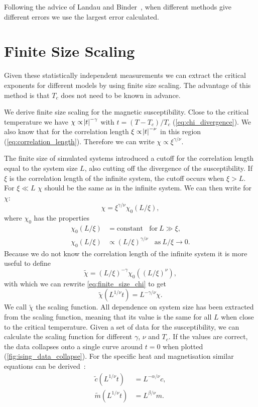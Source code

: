 \documentclass[11pt, a4paper]{report} %
\begin{document}
Following the advice of Landau and Binder~\cite{landau:2015}, when different methods give different errors we use the largest error calculated.


\section{Finite Size Scaling}
Given these statistically independent measurements we can extract the critical exponents for different models by using finite size scaling.
The advantage of this method is that \(T_c\) does not need to be known in advance.

We derive finite size scaling for the magnetic susceptibility.
Close to the critical temperature we have \(\chi \propto \abs{t} ^{-\gamma}\) with \(t = (T-T_c) / T_c\) (\cref{eq:chi_divergence}).
We also know that for the correlation length \(\xi \propto \abs{t}^{-\nu}\) in this region (\cref{eq:correlation_length}).
Therefore we can write \(\chi \propto \xi^{\gamma /\nu}\).

The finite size of simulated systems introduced a cutoff for the correlation length equal to the system size \(L\), also cutting off the divergence of the susceptibility.
If \(\xi\) is the correlation length of the infinite system, the cutoff occurs when \(\xi > L\).
For \(\xi \ll L\) \(\chi\) should be the same as in the infinite system.
We can then write for \(\chi\):
\begin{equation}\label{eq:finite_size_chi}
	\chi = \xi^{\gamma/\nu} \chi_0(L/\xi),
\end{equation}
where \(\chi_0\) has the properties
\begin{align}
	\chi_0(L/\xi) &= \mathrm{constant}\ \ \ \ \mathrm{for}\ L \gg \xi,\\
	\chi_0(L/\xi) &\propto (L/\xi)^{\gamma/\nu}\ \ \ \ \mathrm{as}\ L/\xi \to 0.
\end{align}
Because we do not know the correlation length of the infinite system it is more useful to define
\begin{equation}
	\tilde{\chi} = (L/\xi)^{-\gamma} \chi_0((L/\xi)^{\nu}),
\end{equation}
with which we can rewrite \cref{eq:finite_size_chi} to get
\begin{equation}
	\tilde{\chi}(L^{1/\nu}t) = L^{-\gamma/\nu}\chi.
\end{equation}
We call \(\tilde{\chi}\) the scaling function.
All dependence on system size has been extracted from the scaling function, meaning that its value is the same for all \(L\) when close to the critical temperature.
Given a set of data for the susceptibility, we can calculate the scaling function for different \(\gamma\), \(\nu\) and \(T_c\).
If the values are correct, the data collapses onto a single curve around \(t=0\) when plotted (\cref{fig:ising_data_collapse}).
For the specific heat and magnetisation similar equations can be derived~\cite{newman:1999}:
\begin{align}
	\widetilde{c}(L^{1/\nu}t) &= L^{-\alpha/\nu} c, \\
	\widetilde{m}(L^{1/\nu}t) &= L^{\beta/\nu} m.\label{eq:magnetisation_scaling}
\end{align}
\end{document}
